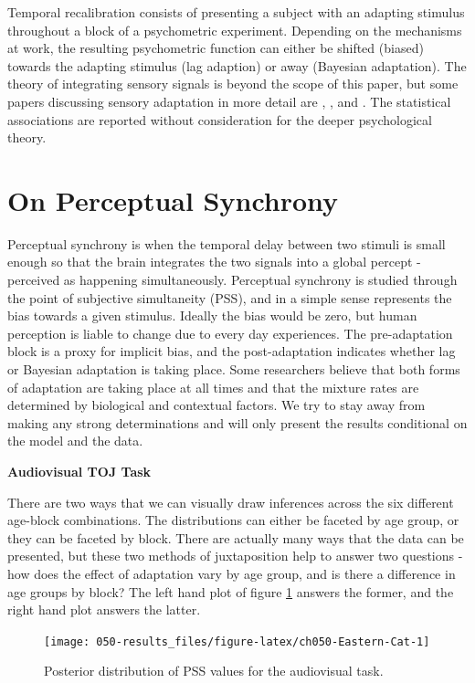 \documentclass[11pt, oneside, openany]{scrbook}
\begin{document}
Temporal recalibration consists of presenting a subject with an adapting stimulus throughout a block of a psychometric experiment. Depending on the mechanisms at work, the resulting psychometric function can either be shifted (biased) towards the adapting stimulus (lag adaption) or away (Bayesian adaptation). The theory of integrating sensory signals is beyond the scope of this paper, but some papers discussing sensory adaptation in more detail are \citet{miyazaki2006bayesian}, \citet{sato2011bayesian}, and \citet{stocker2005sensory}. The statistical associations are reported without consideration for the deeper psychological theory.

\hypertarget{on-perceptual-synchrony}{%
\section{On Perceptual Synchrony}\label{on-perceptual-synchrony}}

Perceptual synchrony is when the temporal delay between two stimuli is small enough so that the brain integrates the two signals into a global percept - perceived as happening simultaneously. Perceptual synchrony is studied through the point of subjective simultaneity (PSS), and in a simple sense represents the bias towards a given stimulus. Ideally the bias would be zero, but human perception is liable to change due to every day experiences. The pre-adaptation block is a proxy for implicit bias, and the post-adaptation indicates whether lag or Bayesian adaptation is taking place. Some researchers believe that both forms of adaptation are taking place at all times and that the mixture rates are determined by biological and contextual factors. We try to stay away from making any strong determinations and will only present the results conditional on the model and the data.

\textbf{Audiovisual TOJ Task}

There are two ways that we can visually draw inferences across the six different age-block combinations. The distributions can either be faceted by age group, or they can be faceted by block. There are actually many ways that the data can be presented, but these two methods of juxtaposition help to answer two questions - how does the effect of adaptation vary by age group, and is there a difference in age groups by block? The left hand plot of figure \ref{fig:ch050-Eastern-Cat} answers the former, and the right hand plot answers the latter.

\begin{figure}

{\centering \texttt{[image: 050-results\_files/figure-latex/ch050-Eastern-Cat-1]} 

}

\caption{Posterior distribution of PSS values for the audiovisual task.}\label{fig:ch050-Eastern-Cat}
\end{figure}
\end{document}
